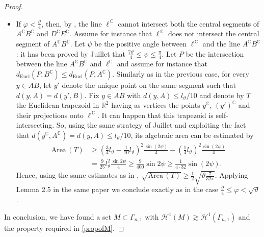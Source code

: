 \documentclass[12pt]{amsart}
\newcommand{\R}{\mathbb R}
\newcommand{\C}{\mathbb C}
\renewcommand{\theta}{\vartheta}
\numberwithin{equation}{section}
\theoremstyle{plain}
\theoremstyle{definition}
\theoremstyle{remark}
\begin{document}
\begin{proof}
\begin{itemize}
    \[d(y,\ell)+d(y',\ell)\geq \sqrt {\text{Area}\,(T)}\geq \frac{1}{8\sqrt\pi}\sqrt\theta.\]
    Therefore there exists a point $p=p(y)\in\{y,y'\}$ such that \begin{equation}\label{eq:p_ell_est}d(p,\ell)\geq \sqrt {\text{Area}\,(T)}\geq \frac{1}{16\sqrt\pi}\sqrt\theta\geq \frac{K}{2}\sqrt\theta,\end{equation}
    by choosing $K\leq \frac{1}{8\sqrt{\pi}}$.
    If we define 
    \[M:=\{p(y):y\in BC,\, d(y,B)\leq l_\theta/10\},\]
    then $\mathcal H^1(M)=\frac{1}{10}l_\theta=\frac{1}{40}\mathcal H^1(\Gamma_{n,1})$ and, by  \eqref{eq:p_ell_est}, $d(p,\ell)\geq \frac{K}{2}\sqrt\theta$ for every $p\in M$.
    \item If $\varphi<\frac{\theta}{4}$, then, by \cite[Lemma 4.2]{Juillet}, the line $\ell^{\,\C}$ cannot intersect both the central segments of $A^\C B^\C$ and $D^\C E^\C$. Assume for instance that $\ell^{\,\C}$ does not intersect the central segment of $A^\C B^\C$. Let $\psi$ be the positive angle between $\ell^{\,\C}$ and the line $A^\C B^\C$: it has been proved by Juillet that $\frac{7\theta}{4}\leq \psi\leq \frac{\pi}{4}$. Let $P$ be the intersection between the line $A^\C B^\C$ and $\ell^\C$ and assume for instance that $d_{\mathrm{Eucl}}(P, B^\C)\leq d_{\mathrm{Eucl}}(P, A^\C)$. Similarly as in the previous case, for every $y\in AB$, let $y'$ denote the unique point on the same segment such that $d(y,A)=d(y',B)$. Fix $y\in AB$ with $d(y,A)\leq l_\theta/10$ and denote by $T$ the Euclidean trapezoid in $\R^2$ having as vertices the points $y^\C$, $(y')^\C$ and their projections onto $\ell ^{\,\C}$. It can happen that this trapezoid is self-intersecting. So, using the same strategy of Juillet and exploiting the fact that $d(y^\C, A^\C)=d(y,A)\leq l_\theta/10$,  its algebraic area can be estimated by
    \[\begin{split}\text{Area}\,(T)&\geq \left(\frac{3}{4}l_\theta-\frac{1}{10}l_\theta\right)^2\frac{\sin(2\psi)}{4}-\left(\frac{1}{4}l_\theta \right)^2\frac{\sin(2\psi)}{4}\\ &=\frac{9}{25}l_\theta^2\frac{\sin 2\psi}{4}\geq\frac{9}{400}\sin 2\psi\geq\frac{1}{4\cdot 32}\sin(2\psi). \end{split}\]
    Hence, using the same estimates as in \cite{Juillet}, $\sqrt{\text{Area}\,(T)}\geq \frac{1}{2}\sqrt{\theta\frac{7}{32\pi}}$. Applying Lemma 2.5 in the same paper we conclude exactly as in the case $\frac{\theta}{4}\leq \varphi<\sqrt{\theta}$.
\end{itemize}
\medskip
In conclusion, we have found a set $M\subset \Gamma_{n,1}$ with $\mathcal{H}^1(M)\gtrsim \mathcal{H}^1(\Gamma_{n,1})$ and the property required in \eqref{propofM}.

\end{proof}
\end{document}
